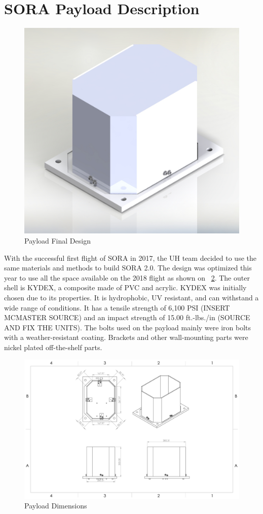 \section{SORA Payload Description}
\label{sec:Hardware}
%
\begin{figure}[h!]
	\begin{center}
		\includegraphics[width=50 mm, scale=0.7]{figures/payload_render.pdf}
		\caption{Payload Final Design}
		\label{fig:payload_render}
	\end{center}
\end{figure}
%
%
%
With the successful first flight of SORA in 2017, the UH team decided to use the same materials and methods to build SORA 2.0.  The design was optimized this year to use all the space available on the 2018 flight as shown on ~\ref{fig:payload_dim}.   The outer shell is KYDEX, a composite made of PVC and acrylic. KYDEX	 was initially chosen due to its properties.  It is hydrophobic, UV resistant, and can withstand a wide range of conditions.  It has a tensile strength of 6,100 PSI (INSERT MCMASTER SOURCE) and an impact strength of 15.00 ft.-lbs./in (SOURCE AND FIX THE UNITS).  The bolts used on the payload mainly were iron bolts with a weather-resistant coating.   Brackets and other wall-mounting parts were nickel plated off-the-shelf parts.
\begin{figure}[h!]
	\begin{center}
		\includegraphics[width=50 mm, scale=0.7]{figures/payload_dimensions.PDF}
		\caption{Payload Dimensions}
		\label{fig:payload_dim}
	\end{center}
\end{figure}
